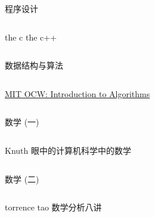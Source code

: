 \begin{frame}{程序设计}
  \begin{columns}
    the c 
    the c++
  \end{columns}
\end{frame}

\begin{frame}{数据结构与算法}
  \begin{columns}
      \centerline{\href{Click: http://open.163.com/special/opencourse/algorithms.html}{MIT OCW: Introduction to Algorithms}}
  \end{columns}
\end{frame}

\begin{frame}{数学 (一)}
  \begin{columns}
      \begin{center}
	Knuth 眼中的计算机科学中的数学
      \end{center}
      \begin{center}
      \end{center}
  \end{columns}
\end{frame}

\begin{frame}{数学 (二)}
  \begin{columns}
    torrence tao
    数学分析八讲
  \end{columns}
\end{frame}
